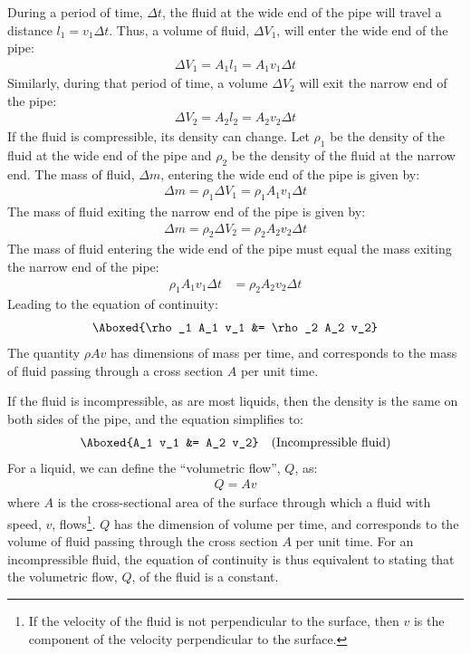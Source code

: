{{During a period of time, $\Delta t$, the fluid at the wide end of the pipe will travel a distance $l_1=v_1\Delta t$. Thus, a volume of fluid, $\Delta V_1$, will enter the wide end of the pipe:
\begin{align*}
\Delta V_1 = A_1 l_1 = A_1 v_1 \Delta t
\end{align*}
Similarly, during that period of time, a volume $\Delta V_2$ will exit the narrow end of the pipe:
\begin{align*}
\Delta V_2 = A_2 l_2 = A_2 v_2 \Delta t
\end{align*}
If the fluid is compressible, its density can change. Let $\rho_1$ be the density of the fluid at the wide end of the pipe and $\rho_2$ be the density of the fluid at the narrow end. The mass of fluid, $\Delta m$, entering the wide end of the pipe is given by:
\begin{align*}
\Delta m = \rho_1 \Delta V_1= \rho_1 A_1 v_1 \Delta t
\end{align*}
The mass of fluid exiting the narrow end of the pipe is given by:
\begin{align*}
\Delta m = \rho_2 \Delta V_2= \rho_2 A_2 v_2 \Delta t
\end{align*}
The mass of fluid entering the wide end of the pipe must equal the mass exiting the narrow end of the pipe:
\begin{align*}
\rho_1 A_1 v_1 \Delta t &= \rho_2 A_2 v_2 \Delta t
\end{align*}
Leading to the equation of continuity:
\begin{align}
\Aboxed{\rho_1 A_1 v_1 &= \rho_2 A_2 v_2}
\end{align}
The quantity $\rho A v$ has dimensions of mass per time, and corresponds to the mass of fluid passing through a cross section $A$ per unit time.

If the fluid is incompressible, as are most liquids, then the density is the same on both sides of the pipe, and the equation simplifies to:
\begin{align}
\Aboxed{A_1 v_1 &= A_2 v_2}\quad\text{(Incompressible fluid)}
\end{align}
For a liquid, we can define the ``volumetric flow'', $Q$, as:
\begin{align*}
Q=Av
\end{align*}
where $A$ is the cross-sectional area of the surface through which a fluid with speed, $v$, flows\footnote{If the velocity of the fluid is not perpendicular to the surface, then $v$ is the component of the velocity perpendicular to the surface.}. $Q$ has the dimension of volume per time, and corresponds to the volume of fluid passing through the cross section $A$ per unit time. For an incompressible fluid, the equation of continuity is thus equivalent to stating that the volumetric flow, $Q$, of the fluid is a constant. 

}}
